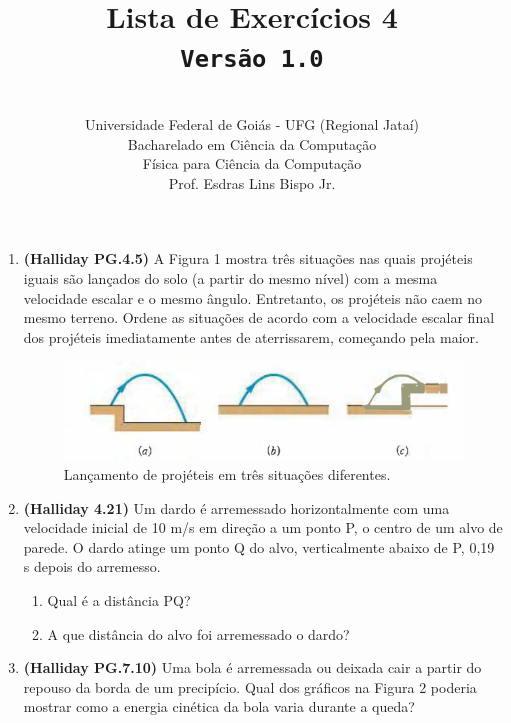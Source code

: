 \documentclass[12pt,a4paper,oneside]{article}
\author{\\Universidade Federal de Goiás - UFG (Regional Jataí) \\Bacharelado em Ciência da Computação \\Física para Ciência da Computação \\Prof. Esdras Lins Bispo Jr.}
\title{
	{\sc \huge Lista de Exercícios 4} 
	\\{\tt Versão 1.0}
}
\begin{document}
\maketitle

\begin{enumerate}

\section{Conceitos}
	
	\item {\bf (Halliday PG.4.5)} A Figura 1 mostra três situações nas quais projéteis iguais são lançados do solo (a partir do mesmo nível) com a mesma velocidade escalar e o mesmo ângulo. Entretanto, os projéteis não caem no mesmo terreno. Ordene as situações de acordo com a velocidade escalar final dos projéteis imediatamente antes de aterrissarem, começando pela maior. 
	
	\begin{figure}[htb]
		\begin{center}
			\includegraphics[scale=0.8]{imagens/fig1}
		\end{center}
		\caption{Lançamento de projéteis em três situações diferentes.}
	\end{figure}
	
	\item {\bf (Halliday 4.21)} Um dardo é arremessado horizontalmente com uma velocidade inicial de 10 m/s em direção a um ponto P, o centro de um alvo de parede. O dardo atinge um ponto Q do alvo, verticalmente abaixo de P, 0,19 s depois do arremesso. \label{q:dardo}
		\begin{enumerate}
			\item Qual é a distância PQ?
			\item A que distância do alvo foi arremessado o dardo?
		\end{enumerate}	
	
	\item {\bf (Halliday PG.7.10)} Uma bola é arremessada ou deixada cair a partir do repouso da borda de um precipício. Qual dos gráficos na Figura 2 poderia mostrar como a energia cinética da bola varia durante a queda?	 \label{q:bola}
	

\end{enumerate}
\end{document}

